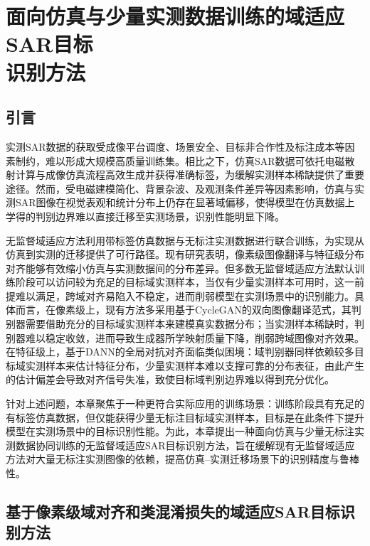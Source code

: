 \chapter[面向仿真与少量实测数据训练的域适应SAR目标识别方法]{面向仿真与少量实测数据训练的域适应SAR目标\\识别方法}

\section{引言}

实测SAR数据的获取受成像平台调度、场景安全、目标非合作性及标注成本等因素制约，难以形成大规模高质量训练集\cite{yang2024transfer, lewis2019sar}。相比之下，仿真SAR数据可依托电磁散射计算与成像仿真流程高效生成并获得准确标签，为缓解实测样本稀缺提供了重要途径。然而，受电磁建模简化、背景杂波、及观测条件差异等因素影响，仿真与实测SAR图像在视觉表观和统计分布上仍存在显著域偏移\cite{lewis2019sar, inkawhich2021bridging}，使得模型在仿真数据上学得的判别边界难以直接迁移至实测场景，识别性能明显下降。

无监督域适应方法利用带标签仿真数据与无标注实测数据进行联合训练，为实现从仿真到实测的迁移提供了可行路径。现有研究表明，像素级图像翻译与特征级分布对齐能够有效缩小仿真与实测数据间的分布差异\cite{shi2021unsupervised, chen2022pixel, luan2025unsupervised, shi2024unsupervised}。但多数无监督域适应方法默认训练阶段可以访问较为充足的目标域实测样本，当仅有少量实测样本可用时，这一前提难以满足，跨域对齐易陷入不稳定，进而削弱模型在实测场景中的识别能力。具体而言，在像素级上，现有方法多采用基于CycleGAN的双向图像翻译范式，其判别器需要借助充分的目标域实测样本来建模真实数据分布；当实测样本稀缺时，判别器难以稳定收敛，进而导致生成器所学映射质量下降，削弱跨域图像对齐效果。在特征级上，基于DANN的全局对抗对齐面临类似困境：域判别器同样依赖较多目标域实测样本来估计特征分布，少量实测样本难以支撑可靠的分布表征，由此产生的估计偏差会导致对齐信号失准，致使目标域判别边界难以得到充分优化。

针对上述问题，本章聚焦于一种更符合实际应用的训练场景：训练阶段具有充足的有标签仿真数据，但仅能获得少量无标注目标域实测样本，目标是在此条件下提升模型在实测场景中的目标识别性能。为此，本章提出一种面向仿真与少量无标注实测数据协同训练的无监督域适应SAR目标识别方法，旨在缓解现有无监督域适应方法对大量无标注实测图像的依赖，提高仿真--实测迁移场景下的识别精度与鲁棒性。

\section{基于像素级域对齐和类混淆损失的域适应SAR目标识别方法}

